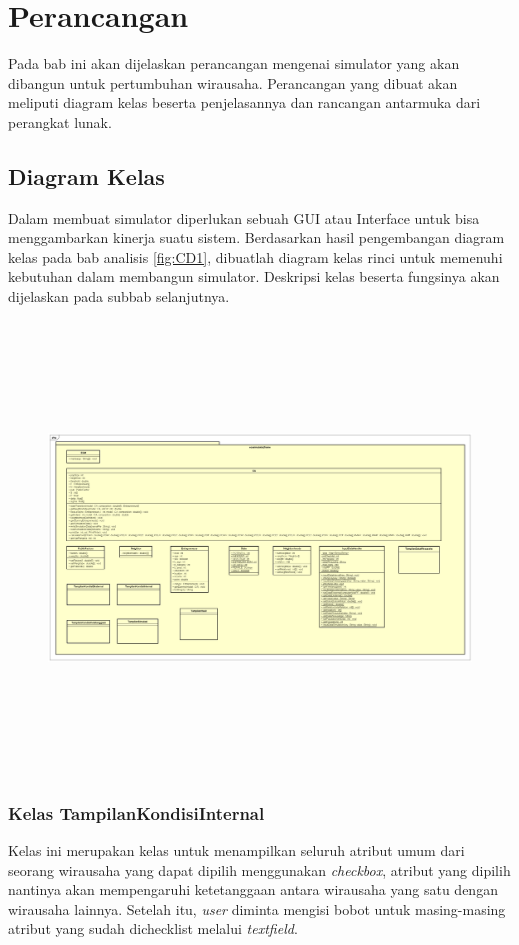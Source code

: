 \chapter{Perancangan}
\label{chap:perancangan}

Pada bab ini akan dijelaskan perancangan mengenai simulator yang akan dibangun untuk pertumbuhan wirausaha. Perancangan yang dibuat akan meliputi diagram kelas beserta penjelasannya dan rancangan antarmuka dari perangkat lunak.


\section{Diagram Kelas}
\label{sec:perancangankelas}

Dalam membuat simulator diperlukan sebuah GUI atau Interface untuk bisa menggambarkan kinerja suatu sistem. Berdasarkan hasil pengembangan diagram kelas pada bab analisis \ref{fig:CD1}, dibuatlah diagram kelas rinci untuk memenuhi kebutuhan dalam membangun simulator. Deskripsi kelas beserta fungsinya akan dijelaskan pada subbab selanjutnya.

\begin{figure} [H]
	\centering  
	\includegraphics[width=18cm, height=12cm]{ClassDiagram3} 
	\label{fig:classdiagram2} 
\end{figure}


\subsection{Kelas TampilanKondisiInternal}
Kelas ini merupakan kelas untuk menampilkan seluruh atribut umum dari seorang wirausaha yang dapat dipilih menggunakan \textit{checkbox}, atribut yang dipilih nantinya akan mempengaruhi ketetanggaan antara wirausaha yang satu dengan wirausaha lainnya. Setelah itu, \textit{user} diminta mengisi bobot untuk masing-masing atribut yang sudah dichecklist melalui \textit{textfield}.

